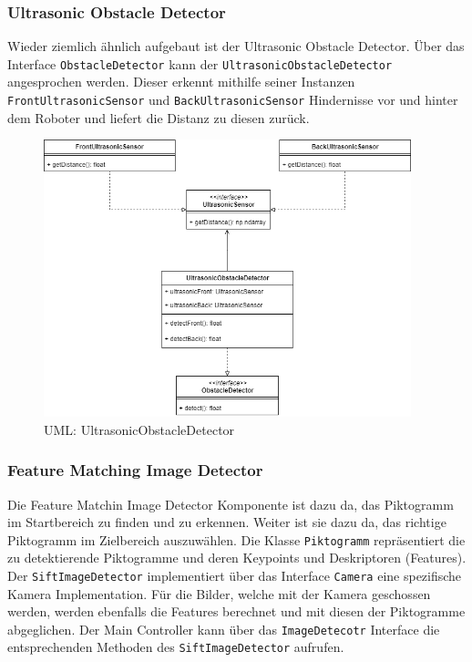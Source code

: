 \subsubsection{Ultrasonic Obstacle Detector}
Wieder ziemlich ähnlich aufgebaut ist der Ultrasonic Obstacle Detector. Über das Interface \texttt{ObstacleDetector} kann der \texttt{UltrasonicObstacleDetector} angesprochen werden. Dieser erkennt mithilfe seiner Instanzen \texttt{FrontUltrasonicSensor} und \texttt{BackUltrasonicSensor} Hindernisse vor und hinter dem Roboter und liefert die Distanz zu diesen zurück.
\begin{figure}[H]
  \includegraphics[width=0.95\textwidth]{img/softwarearchitektur/UML-UltrasonicObstacleDetector.png}
  \centering
  \caption{UML: UltrasonicObstacleDetector}
  \label{fig:uml-ultrasonic-obstacle-detector}
\end{figure}

\subsubsection{Feature Matching Image Detector}
\label{sec:architecture-feature-matching}
Die Feature Matchin Image Detector Komponente ist dazu da, das Piktogramm im Startbereich zu finden und zu erkennen. Weiter ist sie dazu da, das richtige Piktogramm im Zielbereich auszuwählen. 
Die Klasse \texttt{Piktogramm} repräsentiert die zu detektierende Piktogramme und deren Keypoints und Deskriptoren (Features). Der \texttt{SiftImageDetector} implementiert über das Interface \texttt{Camera} eine spezifische Kamera Implementation. Für die Bilder, welche mit der Kamera geschossen werden, werden ebenfalls die Features berechnet und mit diesen der Piktogramme abgeglichen. Der Main Controller kann über das \texttt{ImageDetecotr} Interface die entsprechenden Methoden des \texttt{SiftImageDetector} aufrufen.

